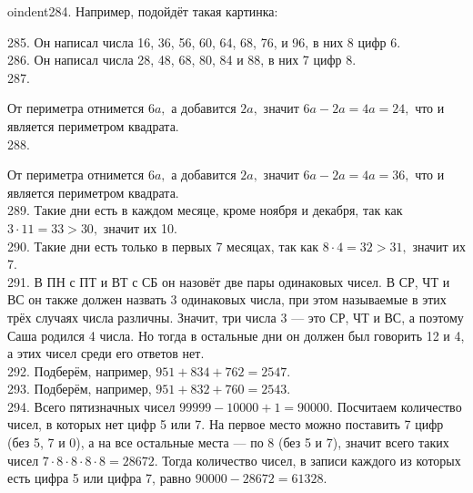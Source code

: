 oindent284. Например, подойдёт такая картинка:
\begin{center}
\begin{figure}[ht!]
\end{figure}
\end{center}
285. Он написал числа 16, 36, 56, 60, 64, 68, 76, и 96, в них 8 цифр 6.\\
286. Он написал числа 28, 48, 68, 80, 84 и 88, в них 7 цифр 8.\\
287. \begin{center}
\begin{figure}[ht!]
\end{figure}
\end{center}
От периметра отнимется $6a,$ а добавится $2a,$ значит $6a-2a=4a=24,$ что и является периметром квадрата.\\
288. \begin{center}
\begin{figure}[ht!]
\end{figure}
\end{center}
От периметра отнимется $6a,$ а добавится $2a,$ значит $6a-2a=4a=36,$ что и является периметром квадрата.\\
289. Такие дни есть в каждом месяце, кроме ноября и декабря, так как $3\cdot11=33>30,$ значит их 10.\\
290. Такие дни есть только в первых 7 месяцах, так как $8\cdot4=32>31,$ значит их 7.\\
291. В ПН с ПТ и ВТ с СБ он назовёт две пары одинаковых чисел. В СР, ЧТ и ВС он также должен назвать 3 одинаковых числа, при этом называемые в этих трёх случаях числа различны. Значит, три числа 3 --- это СР, ЧТ и ВС, а поэтому Саша родился 4 числа. Но тогда в остальные дни он должен был говорить 12 и 4, а этих чисел среди его ответов нет.\\
292. Подберём, например, $951+834+762=2547.$\\
293. Подберём, например, $951+832+760=2543.$\\
294. Всего пятизначных чисел $99999-10000+1=90000.$ Посчитаем количество чисел, в которых нет цифр 5 или 7. На первое место можно поставить 7 цифр (без 5, 7 и 0), а на все остальные места --- по 8 (без 5 и 7), значит всего таких чисел $7\cdot8\cdot8\cdot8\cdot8=28672.$ Тогда количество чисел, в записи каждого из которых есть цифра 5 или цифра 7, равно $90000-28672=61328.$\\

